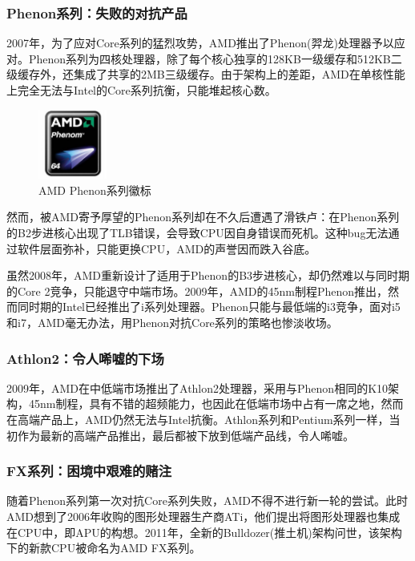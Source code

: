 \documentclass[UTF8]{ctexart}
\begin{document}
\subsubsection{Phenon系列：失败的对抗产品}

2007年，为了应对Core系列的猛烈攻势，AMD推出了Phenon(羿龙)处理器予以应对。Phenon系列为四核处理器，除了每个核心独享的128KB一级缓存和512KB二级缓存外，还集成了共享的2MB三级缓存。由于架构上的差距，AMD在单核性能上完全无法与Intel的Core系列抗衡，只能堆起核心数。
\begin{figure}[H]
    \begin{center}
        \includegraphics[width=0.2\textwidth]{figure/phenon.jpg}
        \caption{AMD Phenon系列徽标}
    \end{center}
\end{figure}
然而，被AMD寄予厚望的Phenon系列却在不久后遭遇了滑铁卢：在Phenon系列的B2步进核心出现了TLB错误，会导致CPU因自身错误而死机。这种bug无法通过软件层面弥补，只能更换CPU，AMD的声誉因而跌入谷底。

虽然2008年，AMD重新设计了适用于Phenon的B3步进核心，却仍然难以与同时期的Core 2竞争，只能退守中端市场。2009年，AMD的45nm制程Phenon\uppercase\expandafter{}推出，然而同时期的Intel已经推出了i系列处理器。Phenon只能与最低端的i3竞争，面对i5和i7，AMD毫无办法，用Phenon对抗Core系列的策略也惨淡收场。

\subsubsection{Athlon2：令人唏嘘的下场}
2009年，AMD在中低端市场推出了Athlon2处理器，采用与Phenon\uppercase\expandafter{}相同的K10架构，45nm制程，具有不错的超频能力，也因此在低端市场中占有一席之地，然而在高端产品上，AMD仍然无法与Intel抗衡。Athlon系列和Pentium系列一样，当初作为最新的高端产品推出，最后都被下放到低端产品线，令人唏嘘。

\subsubsection{FX系列：困境中艰难的赌注}

随着Phenon系列第一次对抗Core系列失败，AMD不得不进行新一轮的尝试。此时AMD想到了2006年收购的图形处理器生产商ATi，他们提出将图形处理器也集成在CPU中，即APU的构想。2011年，全新的Bulldozer(推土机)架构问世，该架构下的新款CPU被命名为AMD FX系列。
\end{document}

